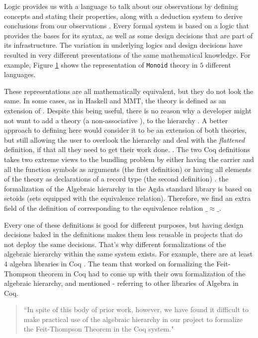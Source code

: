 Logic provides us with a language to talk about our observations by defining concepts and stating their properties, along with a deduction system to derive conclusions from our observations . Every formal system is based on a logic that provides the bases for its syntax, as well as some design decisions that are part of its infrastructure. The variation in underlying logics and design decisions have resulted in very different presentations of the same mathematical knowledge. For example, Figure \ref{mon-diff-lang} shows the representation of \verb|Monoid| theory in $5$ different languages.  
\begin{figure}\label{mon-diff-lang}

\end{figure}
These representations are all mathematically equivalent, but they do not look the same. In some cases, as in Haskell and MMT, the theory \monoid is defined as an extension of \semigroup. Despite this being useful, there is no reason why a developer might not want to add a theory \unital (a non-associative \monoid), to the hierarchy . A better approach to defining \monoid here would consider it to be an extension of both theories, but still allowing the user to overlook the hierarchy and deal with the \emph{flattened} definition, if that all they need to get their work done. . The two Coq definitions takes two extreme views to the bundling problem  by either having the carrier and all the function symbols as arguments (the first definition) or having all elements of the theory as declarations of a record type (the second definition) . the formalization of the Algebraic hierarchy in the Agda standard library is based on setoids (sets equipped with the equivalence relation). Therefore, we find an extra field of the definition of \monoid corresponding to the equivalence relation $\_\approx\_$. 

Every one of these definitions is good for different purposes, but having design decisions baked in the definitions makes them less reusable in projects that do not deploy the same decisions. That's why different formalizations of the algebraic hierarchy within the same system exists. For example, there are at least $4$ algebra libraries in Coq . The team that worked on formalizing the Feit-Thompson theorem in Coq had to come up with their own formalization of the algebraic hierarchy, and mentioned - referring to other libraries of Algebra in Coq. 
\begin{quote}
    ``In spite of this body of prior work, however, we have found it
    difficult to make practical use of the algebraic hierarchy in our project to
    formalize the Feit-Thompson Theorem in the Coq system."
\end{quote}

